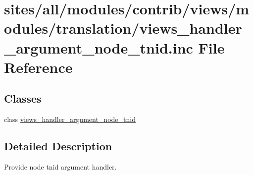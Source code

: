\hypertarget{views__handler__argument__node__tnid_8inc}{
\section{sites/all/modules/contrib/views/modules/translation/views\_\-handler\_\-argument\_\-node\_\-tnid.inc File Reference}
\label{views__handler__argument__node__tnid_8inc}
}
\subsection*{Classes}
\begin{CompactItemize}
\item 
class \hyperlink{classviews__handler__argument__node__tnid}{views\_\-handler\_\-argument\_\-node\_\-tnid}
\end{CompactItemize}


\subsection{Detailed Description}
Provide node tnid argument handler. 